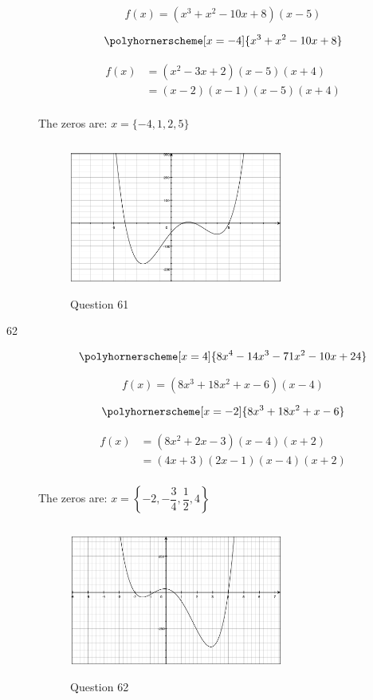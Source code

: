 \documentclass[fleqn,addpoints]{exam}
\begin{document}
\begin{description}
\[
  f(x) = (x^3+x^2-10x+8)(x-5)
\]

\[
  \polyhornerscheme[x=-4]{x^3+x^2-10x+8} \\
\]

\begin{align*}
  f(x) &= (x^2-3x+2)(x-5)(x+4) \\
       &= (x-2)(x-1)(x-5)(x+4) \\
\end{align*}

The zeros are: $x = \{-4, 1, 2, 5 \}$

\begin{figure}[H]
  \centering
  \includegraphics[width=7cm,height=5cm]{question_61.eps}
  \caption*{Question 61}
\end{figure}

\item[62]
\[
  \polyhornerscheme[x=4]{8x^4-14x^3-71x^2-10x+24} \\
\]

\[
  f(x) = (8x^3+18x^2+x-6)(x-4)
\]

\[
  \polyhornerscheme[x=-2]{8x^3+18x^2+x-6} \\
\]

\begin{align*}
  f(x) &= (8x^2+2x-3)(x-4)(x+2) \\
       &= (4x+3)(2x-1)(x-4)(x+2) \\
\end{align*}

The zeros are: $x = \left \{-2, -\dfrac{3}{4}, \dfrac{1}{2}, 4 \right \}$

\begin{figure}[H]
  \centering
  \includegraphics[width=7cm,height=5cm]{question_62.eps}
  \caption*{Question 62}
\end{figure}


\end{description}
\end{document}
